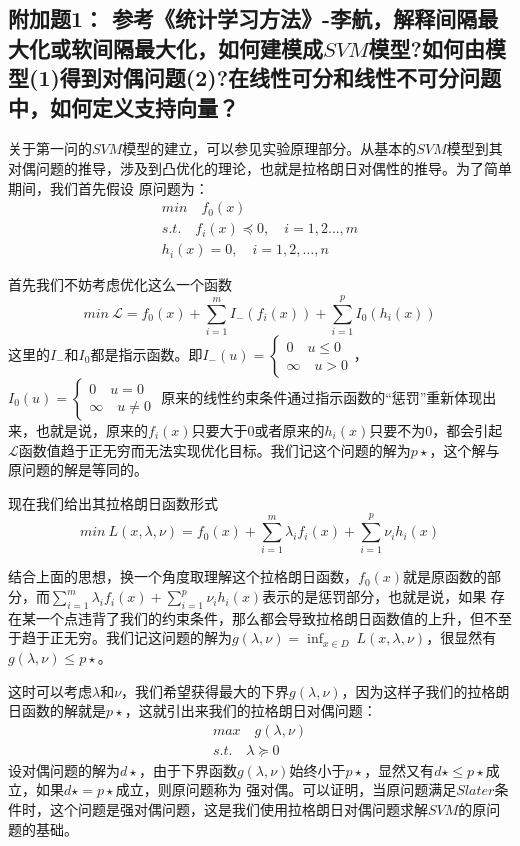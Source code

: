 \documentclass{article}
\begin{document}
 \subsection*{\Large 附加题1： \textbf{参考《统计学习方法》-李航，解释间隔最大化或软间隔最大化，如何建模成$SVM$模型?如何由模型(1)得到对偶问题(2)?在线性可分和线性不可分问题中，如何定义支持向量？
}}
关于第一问的$SVM$模型的建立，可以参见实验原理部分。从基本的$SVM$模型到其对偶问题的推导，涉及到凸优化的理论，也就是拉格朗日对偶性的推导。为了简单期间，我们首先假设
原问题为：
\begin{align}
min\quad f_0(x)\\ s.t.\quad f_i(x)\preceq 0,\quad i=1,2\hdots ,m\\ h_i(x)=0,\quad i=1,2,\hdots,n
\end{align}

首先我们不妨考虑优化这么一个函数
$$min \ \mathcal{L}=f_0(x)+\sum_{i=1}^{m}I_{-}(f_i(x))+\sum_{i=1}^pI_0(h_i(x))$$
这里的$I_-$和$I_0$都是指示函数。即$I_{-}(u)=\left\{ \begin{aligned}0\quad u\leq0\\\infty\quad u>0\end{aligned}\right.$，$I_{0}(u)=\left\{ \begin{aligned}0\quad u=0\\\infty\quad u\ne0\end{aligned}\right.$
原来的线性约束条件通过指示函数的“惩罚”重新体现出来，也就是说，原来的$f_i(x)$只要大于$0$或者原来的$h_i(x)$只要不为$0$，都会引起$\mathcal{L}$函数值趋于正无穷而无法实现优化目标。我们记这个问题的解为$p\star$，这个解与原问题的解是等同的。

现在我们给出其拉格朗日函数形式
$$min\ L(x,\lambda,\nu) =f_0(x)+\sum_{i=1}^{m}\lambda_i f_i(x)+\sum_{i=1}^p\nu_ih_i(x)$$

结合上面的思想，换一个角度取理解这个拉格朗日函数，$f_0(x)$就是原函数的部分，而$\sum_{i=1}^{m}\lambda_i f_i(x)+\sum_{i=1}^p\nu_ih_i(x)$表示的是惩罚部分，也就是说，如果
存在某一个点违背了我们的约束条件，那么都会导致拉格朗日函数值的上升，但不至于趋于正无穷。我们记这问题的解为$g(\lambda,\nu)=\inf_{x\in D}\ L(x,\lambda,\nu)$，很显然有$g(\lambda,\nu)\leq p\star$。

这时可以考虑$\lambda$和$\nu$，我们希望获得最大的下界$g(\lambda,\nu)$，因为这样子我们的拉格朗日函数的解就是$p\star$，这就引出来我们的拉格朗日对偶问题：
\begin{align}max\quad g(\lambda,\nu)\\s.t.\quad \lambda\succeq 0\end{align}设对偶问题的解为$d\star$，由于下界函数$g(\lambda,\nu)$始终小于$p\star$，显然又有$d\star\leq p\star$成立，如果$d\star=p\star$成立，则原问题称为
强对偶。可以证明，当原问题满足$Slater$条件时，这个问题是强对偶问题，这是我们使用拉格朗日对偶问题求解$SVM$的原问题的基础。
\end{document}
